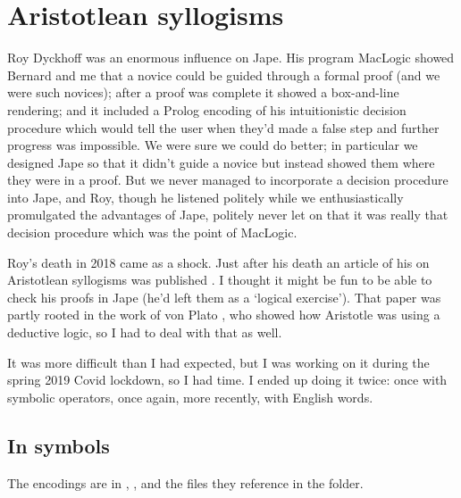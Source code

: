 \chapter{Aristotlean syllogisms}
\label{chap:Aristotle}

Roy Dyckhoff was an enormous influence on Jape. His program MacLogic \citep{dyckhoff1989malt} showed Bernard and me that a novice could be guided through a formal proof (and we were such novices); after a proof was complete it showed a box-and-line rendering; and it included a Prolog encoding of his intuitionistic decision procedure \citep{dyckhoff1992contraction} which would tell the user when they'd made a false step and further progress was impossible. We were sure we could do better; in particular we designed Jape so that it didn't guide a novice but instead showed them where they were in a proof. But we never managed to incorporate a decision procedure into Jape, and Roy, though he listened politely while we enthusiastically promulgated the advantages of Jape, politely never let on that it was really that decision procedure which was the point of MacLogic. 

Roy's death in 2018 came as a shock. Just after his death an article of his on Aristotlean syllogisms was published \citep{dyckhoff2019indefinite}. I thought it might be fun to be able to check his proofs in Jape (he'd left them as a `logical exercise'). That paper was partly rooted in the work of von Plato \citep{von2016aristotle}, who showed how Aristotle was using a deductive logic, so I had to deal with that as well.

It was more difficult than I had expected, but I was working on it during the spring 2019 Covid lockdown, so I had time. I ended up doing it twice: once with symbolic operators, once again, more recently, with English words.

\section{In symbols}

The encodings are in , , and the files they reference in the  folder.

